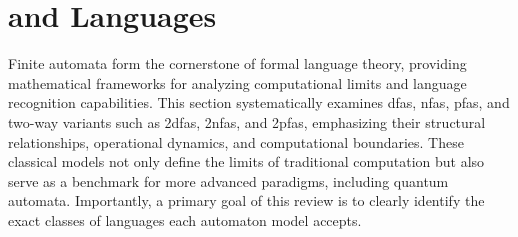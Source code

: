 \section{ and Languages} 
\label{sec:classical-finite-automata} 

Finite automata form the cornerstone of formal language theory, providing mathematical frameworks for analyzing computational limits and language recognition capabilities. This section systematically examines \glspl{dfa}, \glspl{nfa}, \glspl{pfa}, and two-way variants such as \glspl{2dfa}, \glspl{2nfa}, and \glspl{2pfa}, emphasizing their structural relationships, operational dynamics, and computational boundaries. These classical models not only define the limits of traditional computation but also serve as a benchmark for more advanced paradigms, including quantum automata. Importantly, a primary goal of this review is to clearly identify the exact classes of languages each automaton model accepts.






